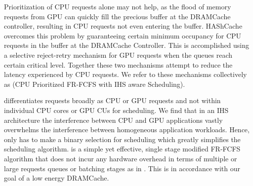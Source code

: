 \par Prioritization of CPU requests alone may not help, as the flood of memory requests from  GPU can quickly fill the precious buffer at the DRAMCache controller, resulting in CPU requests not even entering the buffer. HAShCache overcomes this problem by guaranteeing certain minimum occupancy for CPU requests in the buffer at the DRAMCache Controller. This is accomplished using  a selective reject-retry mechanism for GPU requests when the queues reach certain critical level.  Together these two mechanisms attempt to reduce the latency experienced by CPU requests.  We refer to these  mechanisms collectively as \prioname (CPU Prioritized FR-FCFS with IHS aware Scheduling). 
\par \prioname differentiates requests broadly as CPU or GPU requests and not within individual CPU cores or GPU CUs for scheduling. We find that in an IHS architecture the interference between CPU and GPU applications vastly overwhelms the interference between homogeneous application workloads. Hence, \prioname only has to make a binary selection for scheduling which greatly simplifies the scheduling algorithm. \prioname is a simple yet effective, single stage modified FR-FCFS algorithm that does not incur any hardware overhead in terms of multiple or large requests queues or batching stages as in \cite{sms}. This is in accordance with our goal of a low energy DRAMCache.






